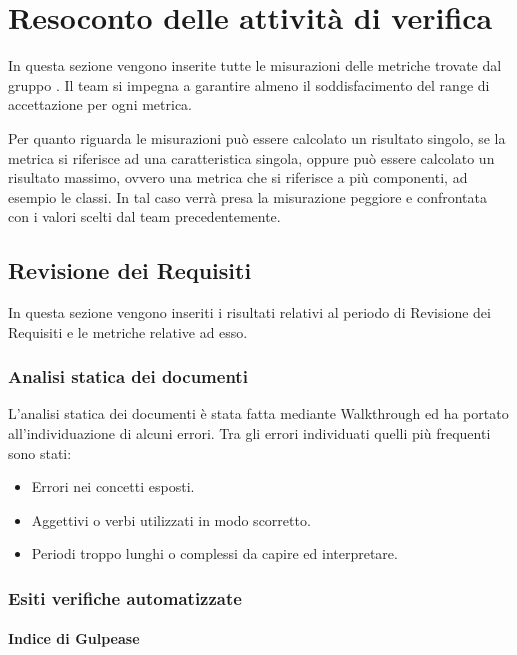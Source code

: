\section{Resoconto delle attività di verifica}

In questa sezione vengono inserite tutte le misurazioni delle metriche trovate dal gruppo \gruppo.
Il team si impegna a garantire almeno il soddisfacimento del range di accettazione per ogni metrica.

Per quanto riguarda le misurazioni può essere calcolato un risultato singolo, se la metrica si riferisce ad una caratteristica singola, oppure può essere calcolato un risultato massimo, ovvero una metrica che si riferisce a più componenti, ad esempio le classi. In tal caso verrà presa la misurazione peggiore e confrontata con i valori scelti dal team precedentemente.


\subsection{Revisione dei Requisiti}
In questa sezione vengono inseriti i risultati relativi al periodo di Revisione dei Requisiti e le metriche relative ad esso.

\subsubsection{Analisi statica dei documenti}
L'analisi statica dei documenti è stata fatta mediante Walkthrough ed ha portato all'individuazione di alcuni errori. Tra gli errori individuati quelli più frequenti sono stati:
		\begin{itemize}
			\item Errori nei concetti esposti.
			\item Aggettivi o verbi utilizzati in modo scorretto.
			\item Periodi troppo lunghi o complessi da capire ed interpretare.
		\end{itemize}

\subsubsection{Esiti verifiche automatizzate}
		
\paragraph{Indice di Gulpease}

